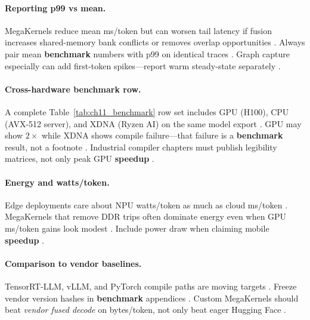 \paragraph{Reporting p99 vs mean.} MegaKernels reduce mean ms/token but can worsen tail latency if fusion increases shared-memory bank conflicts or removes overlap opportunities \citep{patel2025llminference,memoryfloor2026}. Always pair mean \textbf{benchmark} numbers with p99 on identical traces \citep{kwon2023vllm,dao2023flashdecoding}. Graph capture especially can add first-token spikes---report warm steady-state separately \citep{nvidia2024cudagraphs,memoryfloor2026}.

\paragraph{Cross-hardware benchmark row.} A complete Table~\ref{tab:ch11_benchmark} row set includes GPU (H100), CPU (AVX-512 server), and XDNA (Ryzen AI) on the same model export \citep{amd2024xdna,dlbook,yirage2026}. GPU may show $2\times$ while XDNA shows compile failure---that failure is a \textbf{benchmark} result, not a footnote \citep{amd2024aie,chen2020compilerbasedhardw}. Industrial compiler chapters must publish legibility matrices, not only peak GPU \textbf{speedup} \citep{patel2025llminference,liu2024deepseekv3}.

\paragraph{Energy and watts/token.} Edge deployments care about NPU watts/token as much as cloud ms/token \citep{amd2024aie,amd2024xdna}. MegaKernels that remove DDR trips often dominate energy even when GPU ms/token gains look modest \citep{memoryfloor2026,patel2025llminference}. Include power draw when claiming mobile \textbf{speedup} \citep{dlbook,yirage2026}.

\paragraph{Comparison to vendor baselines.} TensorRT-LLM, vLLM, and PyTorch compile paths are moving targets \citep{kwon2023vllm,patel2025llminference}. Freeze vendor version hashes in \textbf{benchmark} appendices \citep{taxbreak2026,memoryfloor2026}. Custom MegaKernels should beat \emph{vendor fused decode} on bytes/token, not only beat eager Hugging Face \citep{dao2022flashattention,nvidia2024cudagraphs}.

